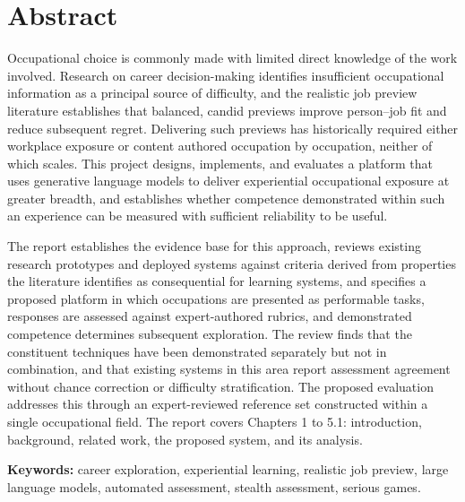 \section*{Abstract}

Occupational choice is commonly made with limited direct knowledge of the work involved. Research on career decision-making identifies insufficient occupational information as a principal source of difficulty, and the realistic job preview literature establishes that balanced, candid previews improve person--job fit and reduce subsequent regret. Delivering such previews has historically required either workplace exposure or content authored occupation by occupation, neither of which scales. This project designs, implements, and evaluates a platform that uses generative language models to deliver experiential occupational exposure at greater breadth, and establishes whether competence demonstrated within such an experience can be measured with sufficient reliability to be useful.

The report establishes the evidence base for this approach, reviews existing research prototypes and deployed systems against criteria derived from properties the literature identifies as consequential for learning systems, and specifies a proposed platform in which occupations are presented as performable tasks, responses are assessed against expert-authored rubrics, and demonstrated competence determines subsequent exploration. The review finds that the constituent techniques have been demonstrated separately but not in combination, and that existing systems in this area report assessment agreement without chance correction or difficulty stratification. The proposed evaluation addresses this through an expert-reviewed reference set constructed within a single occupational field. The report covers Chapters 1 to 5.1: introduction, background, related work, the proposed system, and its analysis.

\textbf{Keywords:} career exploration, experiential learning, realistic job preview, large language models, automated assessment, stealth assessment, serious games.
